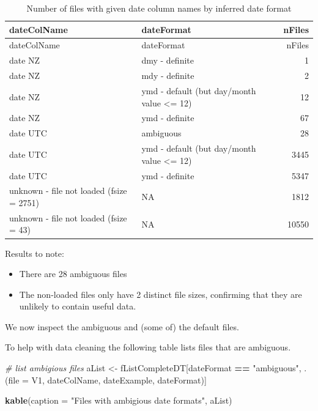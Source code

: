 \documentclass[]{article}
\newenvironment{Shaded}{\begin{snugshade}}{\end{snugshade}}
\newcommand{\KeywordTok}[1]{\textcolor[rgb]{0.13,0.29,0.53}{\textbf{#1}}}
\newcommand{\DataTypeTok}[1]{\textcolor[rgb]{0.13,0.29,0.53}{#1}}
\newcommand{\StringTok}[1]{\textcolor[rgb]{0.31,0.60,0.02}{#1}}
\newcommand{\CommentTok}[1]{\textcolor[rgb]{0.56,0.35,0.01}{\textit{#1}}}
\newcommand{\OperatorTok}[1]{\textcolor[rgb]{0.81,0.36,0.00}{\textbf{#1}}}
\newcommand{\NormalTok}[1]{#1}
\providecommand{\tightlist}{%
  \setlength{\itemsep}{0pt}\setlength{\parskip}{0pt}}
\begin{document}
\begin{longtable}[]{@{}llr@{}}
\caption{Number of files with given date column names by inferred date
format}\tabularnewline
\toprule
dateColName & dateFormat & nFiles\tabularnewline
\midrule
\endfirsthead
\toprule
dateColName & dateFormat & nFiles\tabularnewline
\midrule
\endhead
date NZ & dmy - definite & 1\tabularnewline
date NZ & mdy - definite & 2\tabularnewline
date NZ & ymd - default (but day/month value \textless{}= 12) &
12\tabularnewline
date NZ & ymd - definite & 67\tabularnewline
date UTC & ambiguous & 28\tabularnewline
date UTC & ymd - default (but day/month value \textless{}= 12) &
3445\tabularnewline
date UTC & ymd - definite & 5347\tabularnewline
unknown - file not loaded (fsize = 2751) & NA & 1812\tabularnewline
unknown - file not loaded (fsize = 43) & NA & 10550\tabularnewline
\bottomrule
\end{longtable}

Results to note:

\begin{itemize}
\tightlist
\item
  There are 28 ambiguous files
\item
  The non-loaded files only have 2 distinct file sizes, confirming that
  they are unlikely to contain useful data.
\end{itemize}

We now inspect the ambiguous and (some of) the default files.

To help with data cleaning the following table lists files that are
ambiguous.

\begin{Shaded}
\begin{Highlighting}[]
\CommentTok{# list ambigious files}
\NormalTok{aList <-}\StringTok{ }\NormalTok{fListCompleteDT[dateFormat }\OperatorTok{==}\StringTok{ "ambiguous"}\NormalTok{, .(}\DataTypeTok{file =}\NormalTok{ V1, dateColName, dateExample, dateFormat)]}

\KeywordTok{kable}\NormalTok{(}\DataTypeTok{caption =} \StringTok{"Files with ambigious date formats"}\NormalTok{, aList)}
\end{Highlighting}
\end{Shaded}
\end{document}
